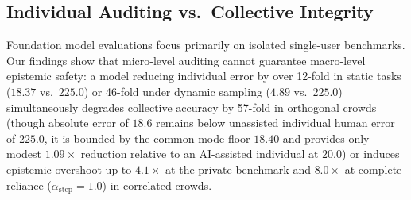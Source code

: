 \documentclass
[letterpaper]{article}
\begin{document}
\subsection{Individual Auditing vs.\ Collective Integrity}
Foundation model evaluations focus primarily on isolated single-user benchmarks. Our findings show that micro-level auditing cannot guarantee macro-level epistemic safety: a model reducing individual error by over 12-fold in static tasks ($18.37$ vs.\ $225.0$) or 46-fold under dynamic sampling ($4.89$ vs.\ $225.0$) simultaneously degrades collective accuracy by 57-fold in orthogonal crowds (though absolute error of $18.6$ remains below unassisted individual human error of $225.0$, it is bounded by the common-mode floor $18.40$ and provides only modest $1.09\times$ reduction relative to an AI-assisted individual at $20.0$) or induces epistemic overshoot up to $4.1\times$ at the private benchmark and $8.0\times$ at complete reliance ($\alpha_{\text{step}} = 1.0$) in correlated crowds.
\end{document}
